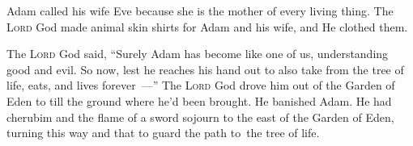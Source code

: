 \begin{inparaenum}
  
  
  
   Adam called his wife Eve because she is the mother of every living thing.%
   The \textsc{Lord} God made animal skin shirts for Adam and his wife, and He clothed them.%
  
   The \textsc{Lord} God said, ``Surely Adam has become like one of us, understanding good and evil. So now, lest he reaches his hand out to also take from the tree of life, eats, and lives forever~---''%
   The \textsc{Lord} God drove him out of the Garden of Eden to till the ground where he'd been brought.%
   He banished Adam. He had cherubim and the flame of a sword sojourn to the east of the Garden of Eden, turning this way and that to guard the path to\understood\ the tree of life.%
\end{inparaenum}
